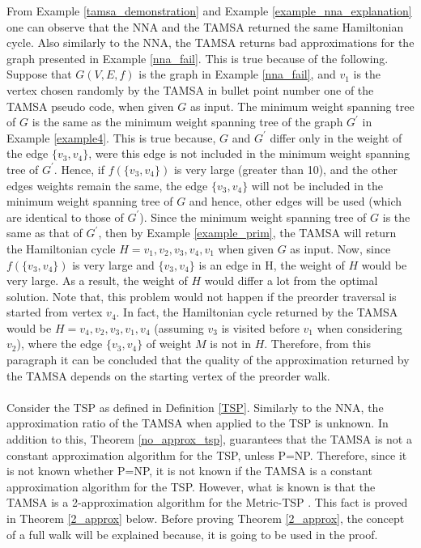 \documentclass[12pt]{article}
\numberwithin{equation}{subsection}
\numberwithin{table}{subsection}
\numberwithin{algorithm}{subsection}
\begin{document}
From Example \ref{tamsa_demonstration} and Example \ref{example_nna_explanation} one can observe that the NNA and the TAMSA returned the same Hamiltonian cycle. Also similarly to the NNA, the TAMSA returns bad approximations for the graph presented in Example \ref{nna_fail}. This is true because of the following. Suppose that $G(V,E,f)$ is the graph in Example \ref{nna_fail}, and $v_1$ is the vertex chosen randomly by the TAMSA in bullet point number one of the TAMSA pseudo code, when given $G$ as input. The minimum weight spanning tree of $G$ is the same as the minimum weight spanning tree of the graph $G^\prime$ in Example \ref{example4}. This is true because, $G$ and $G^\prime$ differ only in the weight of the edge $\{v_3, v_4\}$, were this edge is not included in the minimum weight spanning tree of $G^\prime$. Hence, if $f(\{v_3, v_4\})$ is very large (greater than 10), and the other edges weights remain the same, the edge $\{v_3, v_4\}$ will not be included in the minimum weight spanning tree of $G$ and hence, other edges will be used (which are identical to those of $G^\prime$). Since the minimum weight spanning tree of $G$ is the same as that of $G^\prime$, then by Example \ref{example_prim}, the TAMSA will return the Hamiltonian cycle $ H = v_1, v_2, v_3, v_4, v_1$ when given $G$ as input. Now, since $f(\{v_3, v_4\})$ is very large and $\{v_3, v_4\}$ is an edge in H, the weight of $H$ would be very large. As a result, the weight of $H$ would differ a lot from the optimal solution. Note that, this problem would not happen if the preorder traversal is started from vertex $v_4$. In fact, the Hamiltonian cycle returned by the TAMSA would be $H = v_4, v_2, v_3, v_1, v_4$ (assuming $v_3$ is visited before $v_1$ when considering $v_2$), where the edge $\{v_3, v_4\}$ of weight $M$ is not in $H$. Therefore, from this paragraph it can be concluded that the quality of the approximation returned by the TAMSA depends on the starting vertex of the preorder walk.\\\\
Consider the TSP as defined in Definition \ref{TSP}. Similarly to the NNA, the approximation ratio of the TAMSA when applied to the TSP is unknown. In addition to this, Theorem \ref{no_approx_tsp}, guarantees that the TAMSA is not a constant approximation algorithm for the TSP, unless P=NP. Therefore, since it is not known whether P=NP, it is not known if the TAMSA is a constant approximation algorithm for the TSP. However, what is known is that the TAMSA is a 2-approximation algorithm for the Metric-TSP \cite{cormen_leiserson_rivest_stein}. This fact is proved in Theorem \ref{2_approx} below. Before proving Theorem \ref{2_approx}, the concept of a full walk will be explained because, it is going to be used in the proof.\\\\
\end{document}
